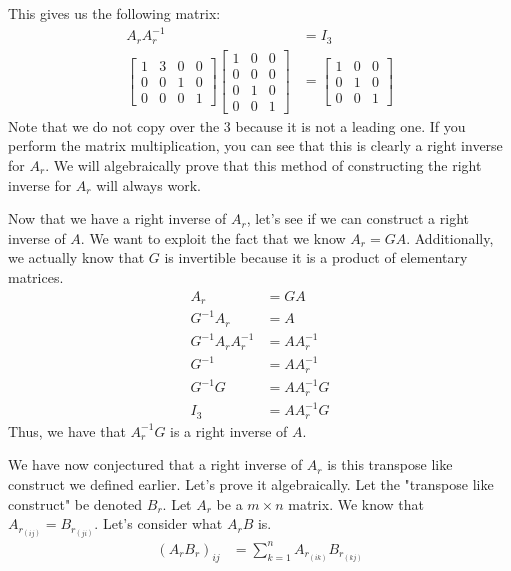\begin{example}
    This gives us the following matrix:
        \begin{align*}
        A_rA_r^{-1}&=I_3\\
        \begin{bmatrix}
        1 & 3 & 0 & 0\\
        0 & 0 & 1 & 0\\
        0 & 0 & 0 &1
    \end{bmatrix}\begin{bmatrix}
        1 & 0 & 0\\
        0 & 0 & 0\\
        0 & 1 & 0\\
        0 & 0 & 1
    \end{bmatrix}&=\begin{bmatrix}
        1 & 0 & 0\\
        0 & 1 & 0\\
        0 & 0 & 1
    \end{bmatrix}
    \end{align*}
    Note that we do not copy over the $3$ because it is not a leading one. If you perform the matrix multiplication, you can see that this is clearly a right inverse for $A_r$. We will algebraically prove that this method of constructing the right inverse for $A_r$ will always work.

    Now that we have a right inverse of $A_r$, let's see if we can construct a right inverse of $A$. We want to exploit the fact that we know $A_r=GA$. Additionally, we actually know that $G$ is invertible because it is a product of elementary matrices.
    \begin{align*}
        A_r&=GA\\
        G^{-1}A_r&=A\\
        G^{-1}A_rA_r^{-1}&=AA_r^{-1}\\
        G^{-1}&=AA_r^{-1}\\
        G^{-1}G&=AA_r^{-1}G\\
        I_3&=AA_r^{-1}G
    \end{align*}
    Thus, we have that $A_r^{-1}G$ is a right inverse of $A$.
\end{example}
We have now conjectured that a right inverse of $A_r$ is this transpose like construct we defined earlier. Let's prove it algebraically. Let the "transpose like construct" be denoted $B_r$. Let $A_r$ be a $m\times n$ matrix. We know that $A_{r_{(ij)}}=B_{r_{(ji)}}$. Let's consider what $A_rB$ is.
\begin{align*}
    (A_rB_r)_{ij}&=\sum_{k=1}^n A_{r_{(ik)}}B_{r_{(kj)}}
\end{align*}
